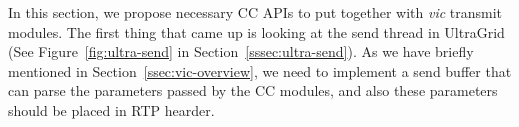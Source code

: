 
In this section, we propose necessary CC APIs to put together with \emph{vic}
transmit modules. The first thing that came up is looking at the send thread in
UltraGrid (See Figure~\ref{fig:ultra-send} in Section~\ref{sssec:ultra-send}).
As we have briefly mentioned in Section~\ref{ssec:vic-overview}, we need to
implement a send buffer that can parse the parameters passed by the CC modules,
and also these parameters should be placed in RTP hearder.
